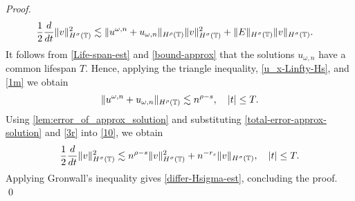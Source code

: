 \begin{proof}
%
%
\begin{equation}
\begin{split}
\frac{1}{2}\frac{d}{dt} \|v\|_{H^\sigma(\mathbb{T})}^2
& \lesssim
\|u^{\omega,n} + u_{\omega,n}\|_{H^{\rho}(\mathbb{T})} \|v\|_{H^\sigma(\mathbb{T})}^2
+ \|E\|_{H^\sigma(\mathbb{T})}
\|v\|_{H^\sigma(\mathbb{T})}.
\label{10}
\end{split}
\end{equation}
%
%
It follows from \eqref{Life-span-est} and 
\eqref{bound-approx} that the solutions $u_{\omega,n}$ have a common 
lifespan $T$. Hence, applying the triangle inequality, 
\eqref{u_x-Linfty-Hs}, and \eqref{1m} we obtain  
%
%
\begin{equation}
\|u^{\omega,n} + u_{\omega,n}\|_{H^\rho(\mathbb{T})} \lesssim n^{\rho -s}, 
\quad |t| \le T.
\label{3r}
\end{equation}
%
%
%
%
%
%
Using \cref{lem:error_of_approx_solution} and
substituting \eqref{total-error-approx-solution} and \eqref{3r}
into \eqref{10}, we obtain
%
%
\begin{equation}
\begin{split}
\frac{1}{2}\frac{d}{dt}\|v\|_{H^\sigma(\mathbb{T})}^2 \lesssim n^{\rho - s}
\|v\|_{H^\sigma(\mathbb{T})}^2 + n^{-r_s}\|v\|_{H^\sigma(\mathbb{T})}, \quad |t| \le T.
\label{200r}
\end{split}
\end{equation}
%
%
Applying Gronwall's inequality gives \eqref{differ-Hsigma-est}, concluding 
the proof. \qed 
%
%
%
%
%
%
%


\end{proof}
